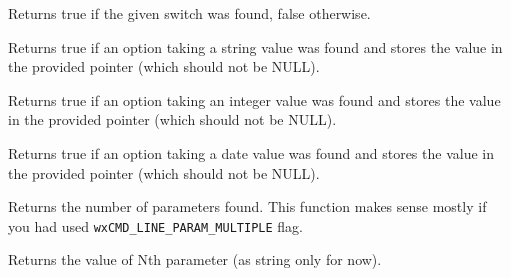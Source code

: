 Returns true if the given switch was found, false otherwise.


\label{wxcmdlineparserfoundstringoption}


Returns true if an option taking a string value was found and stores the
value in the provided pointer (which should not be NULL).


\label{wxcmdlineparserfoundintoption}


Returns true if an option taking an integer value was found and stores
the value in the provided pointer (which should not be NULL).


\label{wxcmdlineparserfounddateoption}


Returns true if an option taking a date value was found and stores the
value in the provided pointer (which should not be NULL).


\label{wxcmdlineparsergetparamcount}


Returns the number of parameters found. This function makes sense mostly if you
had used {\tt wxCMD\_LINE\_PARAM\_MULTIPLE} flag.


\label{wxcmdlineparsergetparam}


Returns the value of Nth parameter (as string only for now).



